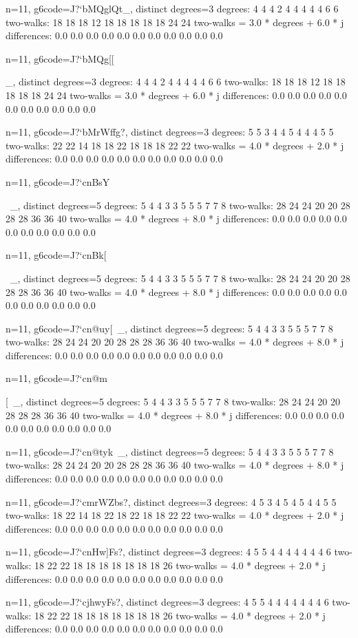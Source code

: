 {{{{{{{{{{{{{{{{n=11, g6code=J?`bMQglQt_, distinct degrees=3
degrees: 4 4 4 2 4 4 4 4 4 6 6 
two-walks: 18 18 18 12 18 18 18 18 18 24 24 
two-walks = 3.0 * degrees + 6.0 * j
differences: 0.0 0.0 0.0 0.0 0.0 0.0 0.0 0.0 0.0 0.0 0.0 

n=11, g6code=J?`bMQg[[{_, distinct degrees=3
degrees: 4 4 4 2 4 4 4 4 4 6 6 
two-walks: 18 18 18 12 18 18 18 18 18 24 24 
two-walks = 3.0 * degrees + 6.0 * j
differences: 0.0 0.0 0.0 0.0 0.0 0.0 0.0 0.0 0.0 0.0 0.0 

n=11, g6code=J?`bMrWffg?, distinct degrees=3
degrees: 5 5 3 4 4 5 4 4 4 5 5 
two-walks: 22 22 14 18 18 22 18 18 18 22 22 
two-walks = 4.0 * degrees + 2.0 * j
differences: 0.0 0.0 0.0 0.0 0.0 0.0 0.0 0.0 0.0 0.0 0.0 

n=11, g6code=J?`cnBsY{~_, distinct degrees=5
degrees: 5 4 4 3 3 5 5 5 7 7 8 
two-walks: 28 24 24 20 20 28 28 28 36 36 40 
two-walks = 4.0 * degrees + 8.0 * j
differences: 0.0 0.0 0.0 0.0 0.0 0.0 0.0 0.0 0.0 0.0 0.0 

n=11, g6code=J?`cnBk[{~_, distinct degrees=5
degrees: 5 4 4 3 3 5 5 5 7 7 8 
two-walks: 28 24 24 20 20 28 28 28 36 36 40 
two-walks = 4.0 * degrees + 8.0 * j
differences: 0.0 0.0 0.0 0.0 0.0 0.0 0.0 0.0 0.0 0.0 0.0 

n=11, g6code=J?`cn@uy[~_, distinct degrees=5
degrees: 5 4 4 3 3 5 5 5 7 7 8 
two-walks: 28 24 24 20 20 28 28 28 36 36 40 
two-walks = 4.0 * degrees + 8.0 * j
differences: 0.0 0.0 0.0 0.0 0.0 0.0 0.0 0.0 0.0 0.0 0.0 

n=11, g6code=J?`cn@m{[~_, distinct degrees=5
degrees: 5 4 4 3 3 5 5 5 7 7 8 
two-walks: 28 24 24 20 20 28 28 28 36 36 40 
two-walks = 4.0 * degrees + 8.0 * j
differences: 0.0 0.0 0.0 0.0 0.0 0.0 0.0 0.0 0.0 0.0 0.0 

n=11, g6code=J?`cn@tyk~_, distinct degrees=5
degrees: 5 4 4 3 3 5 5 5 7 7 8 
two-walks: 28 24 24 20 20 28 28 28 36 36 40 
two-walks = 4.0 * degrees + 8.0 * j
differences: 0.0 0.0 0.0 0.0 0.0 0.0 0.0 0.0 0.0 0.0 0.0 

n=11, g6code=J?`cmrWZbs?, distinct degrees=3
degrees: 4 5 3 4 5 4 5 4 4 5 5 
two-walks: 18 22 14 18 22 18 22 18 18 22 22 
two-walks = 4.0 * degrees + 2.0 * j
differences: 0.0 0.0 0.0 0.0 0.0 0.0 0.0 0.0 0.0 0.0 0.0 

n=11, g6code=J?`cnHw]Fs?, distinct degrees=3
degrees: 4 5 5 4 4 4 4 4 4 4 6 
two-walks: 18 22 22 18 18 18 18 18 18 18 26 
two-walks = 4.0 * degrees + 2.0 * j
differences: 0.0 0.0 0.0 0.0 0.0 0.0 0.0 0.0 0.0 0.0 0.0 

n=11, g6code=J?`cjhwyFs?, distinct degrees=3
degrees: 4 5 5 4 4 4 4 4 4 4 6 
two-walks: 18 22 22 18 18 18 18 18 18 18 26 
two-walks = 4.0 * degrees + 2.0 * j
differences: 0.0 0.0 0.0 0.0 0.0 0.0 0.0 0.0 0.0 0.0 0.0 

}}}}}}}}}}}}}}}}}}}}
